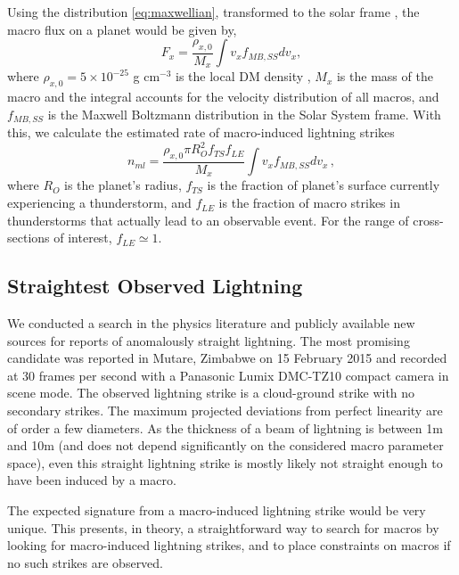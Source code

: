 \documentclass[%
 reprint,
 amsmath,amssymb,
 aps,
]{revtex4-2}
\begin{document}
    Using the distribution \eqref{eq:maxwellian}, transformed to the solar frame \citep{Freese2013}, the macro flux on a planet would be given by,
    \begin{equation}\label{eq:planet_macro_flux}
        F_{x} = \frac{\rho_{x,0}}{M_{x}} \int v_{x} f_{MB,SS} dv_x,
    \end{equation}
    where $\rho_{x,0} = 5 \times 10^{-25}$ g cm$^{-3}$ is the local DM density \cite{Bovy2012}, $M_{x}$ is the mass of the macro and the integral accounts for the velocity distribution of all macros, and $f_{MB,SS}$ is the Maxwell Boltzmann distribution in the Solar System frame. With this, we calculate the estimated rate of macro-induced lightning strikes
    \begin{equation}\label{eq:macro_lightning_rate}
        n_{ml} = \frac{\rho_{x,0} \pi R_{O}^2 f_{TS} f_{LE}}{M_{x}}\int v_{x} f_{MB,SS} dv_x\,,
    \end{equation}
    where $R_{O}$ is the planet's radius, $f_{TS}$ is the fraction of planet's surface currently experiencing a thunderstorm, and $f_{LE}$ is the fraction of macro strikes in thunderstorms that actually lead to an observable event. For the range of cross-sections of interest, $f_{LE}\simeq1$.

    \subsection{Straightest Observed Lightning} %
    \label{sub:straightest_observed_lightning}

        We conducted a search in the physics literature and publicly available new sources for reports of anomalously straight lightning. The most promising candidate was reported in Mutare, Zimbabwe on 15 February 2015 \cite{Zimbabwe} and recorded at 30 frames per second with a Panasonic Lumix DMC-TZ10 compact camera in scene mode. The observed lightning strike is a cloud-ground strike with no secondary strikes. The maximum projected deviations from perfect linearity are of order a few diameters. As the thickness of a beam of lightning is between 1m and 10m (and does not depend significantly on the considered macro parameter space), even this straight lightning strike is mostly likely not straight enough to have been induced by a macro.

        The expected signature from a macro-induced lightning strike would be very unique. This presents, in theory, a straightforward way to search for macros by looking for macro-induced lightning strikes, and to place constraints on macros if no such strikes are observed. 
\end{document}
